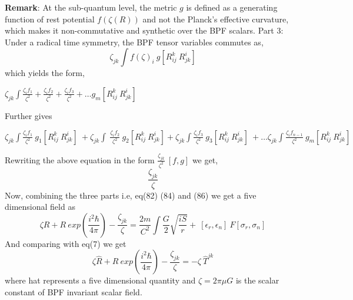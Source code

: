 \documentclass{article}
\begin{document}
 {\bf Remark}: At the sub-quantum level, the metric $g$ is defined as a generating  function of rest potential $f(\zeta(R))$ and not the Planck's effective curvature, which makes it non-commutative and synthetic over the BPF scalars.\vspace{5mm}
 \newline
 Part 3: Under a radical time symmetry, the BPF tensor variables commutes as,
 \begin{equation}
     \zeta_{jk} \int f(\zeta)_i \ g[R_{ij}^k \ R_{jk}^i] 
 \end{equation} which yields the form,
 \begin{center}
 \begin{math}
    \zeta_{jk} \int \frac{\zeta_i f_1}{\zeta^2} + \frac{\zeta_i f_2}{\zeta^2} + \frac{\zeta_i f_3}{\zeta^2} + \dots  g_m [R_{ij}^k \ R_{jk}^i] 
 \end{math}
 \end{center} Further gives
 \begin{center}
 \begin{math}
       \zeta_{jk} \int \frac{\zeta_i f_1}{\zeta^2} \ g_1 [R_{ij}^k \ R_{jk}^i] \ + \zeta_{jk} \int \ \frac{\zeta_i f_2}{\zeta^2} \ g_2 [R_{ij}^k \ R_{jk}^i] +  \zeta_{jk} \int \frac{\zeta_i f_3}{\zeta^2} \ g_3 [R_{ij}^k \ R_{jk}^i] \ + \dots \zeta_{jk} \int \frac{\zeta_i f_{n-1}}{\zeta^2} \  g_m [R_{ij}^k \ R_{jk}^i] 
 \end{math}
 \end{center}
 Rewriting the above equation in the form \begin{math}
 \frac{ \zeta_{jk}}{\zeta^2} \ [f, g] 
 \end{math} we get, \begin{equation}
  \frac{\zeta_{jk}}{\zeta} 
 \end{equation}
 Now, combining the three parts i.e, eq(82) (84) and (86) we get a five dimensional field as \begin{equation}
      \zeta R + R\ exp(\frac{i^2 \hbar}{4 \pi}) - \frac{\zeta_{jk}}{\zeta}  =  \frac{2m}{C^2} \int  \frac{G}{2} \sqrt{\frac{iS}{r}}+ \ [\epsilon_r ,\epsilon_n] \ F [\sigma_r ,\sigma_n] 
   \end{equation} And comparing with eq(7) we get 
   \begin{equation}
         \zeta \hat R + \hat R\ exp(\frac{i^2 \hbar}{4 \pi}) - \frac{\zeta_{jk}}{\zeta} = - \zeta \ \hat T^{jk} 
   \end{equation} where hat represents a five dimensional quantity and $\zeta = 2 \pi \mu G$ is the scalar constant of BPF invariant scalar field.
\end{document}

